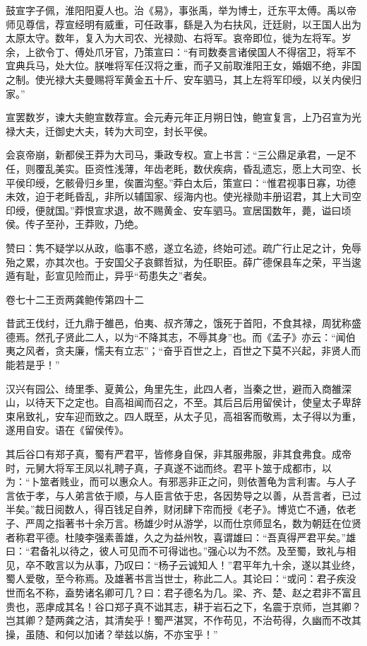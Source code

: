 \documentclass[12pt,UTF8]{ctexbook}
\begin{document}
鼓宣字子佩，淮阳阳夏人也。治《易》，事张禹，举为博士，迁东平太傅。禹以帝师见尊信，荐宣经明有威重，可任政事，繇是入为右扶风，迁廷尉，以王国人出为太原太守。数年，复入为大司农、光禄勋、右将军。哀帝即位，徙为左将军。岁余，上欲令丁、傅处爪牙官，乃策宣曰：“有司数奏言诸侯国人不得宿卫，将军不宜典兵马，处大位。朕唯将军任汉将之重，而子又前取淮阳王女，婚姻不绝，非国之制。使光禄大夫曼赐将军黄金五十斤、安车驷马，其上左将军印绶，以关内侯归家。”



宣罢数岁，谏大夫鲍宣数荐宣。会元寿元年正月朔日蚀，鲍宣复言，上乃召宣为光禄大夫，迁御史大夫，转为大司空，封长平侯。



会哀帝崩，新都侯王莽为大司马，秉政专权。宣上书言：“三公鼎足承君，一足不任，则覆乱美实。臣资性浅薄，年齿老眊，数伏疾病，昏乱遗忘，愿上大司空、长平侯印绶，乞骸骨归乡里，俟置沟壑。”莽白太后，策宣曰：“惟君视事日寡，功德未效，迫于老眊昏乱，非所以辅国家、绥海内也。使光禄勋丰册诏君，其上大司空印绶，便就国。”莽恨宣求退，故不赐黄金、安车驷马。宣居国数年，薨，谥曰顷侯。传子至孙，王莽败，乃绝。



赞曰：隽不疑学以从政，临事不惑，遂立名迹，终始可述。疏广行止足之计，免辱殆之累，亦其次也。于安国父子哀鳏哲狱，为任职臣。薛广德保县车之荣，平当逡遁有耻，彭宣见险而止，异乎“苟患失之”者矣。





卷七十二王贡两龚鲍传第四十二



昔武王伐纣，迁九鼎于雒邑，伯夷、叔齐薄之，饿死于首阳，不食其禄，周犹称盛德焉。然孔子贤此二人，以为“不降其志，不辱其身”也。而《孟子》亦云：“闻伯夷之风者，贪夫廉，懦夫有立志”；“奋乎百世之上，百世之下莫不兴起，非贤人而能若是乎！”



汉兴有园公、绮里季、夏黄公，角里先生，此四人者，当秦之世，避而入商雒深山，以待天下之定也。自高祖闻而召之，不至。其后吕后用留侯计，使皇太子卑辞束帛致礼，安车迎而致之。四人既至，从太子见，高祖客而敬焉，太子得以为重，遂用自安。语在《留侯传》。



其后谷口有郑子真，蜀有严君平，皆修身自保，非其服弗服，非其食弗食。成帝时，元舅大将军王凤以礼聘子真，子真遂不诎而终。君平卜筮于成都市，以为：“卜筮者贱业，而可以惠众人。有邪恶非正之问，则依蓍龟为言利害。与人子言依于孝，与人弟言依于顺，与人臣言依于忠，各因势导之以善，从吾言者，已过半矣。”裁日阅数人，得百钱足自养，财闭肆下帘而授《老子》。博览亡不通，依老子、严周之指著书十余万言。杨雄少时从游学，以而仕京师显名，数为朝廷在位贤者称君平德。杜陵李强素善雄，久之为益州牧，喜谓雄曰：“吾真得严君平矣。”雄曰：“君备礼以待之，彼人可见而不可得诎也。”强心以为不然。及至蜀，致礼与相见，卒不敢言以为从事，乃叹曰：“杨子云诚知人！”君平年九十余，遂以其业终，蜀人爱敬，至今称焉。及雄著书言当世士，称此二人。其论曰：“或问：君子疾没世而名不称，盍势诸名卿可几？曰：君子德名为几。梁、齐、楚、赵之君非不富且贵也，恶虖成其名！谷口郑子真不诎其志，耕于岩石之下，名震于京师，岂其卿？岂其卿？楚两龚之洁，其清矣乎！蜀严湛冥，不作苟见，不治苟得，久幽而不改其操，虽随、和何以加诸？举兹以旃，不亦宝乎！”
\end{document}
